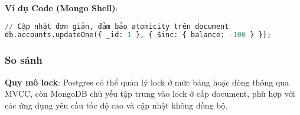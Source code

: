 \textbf{Ví dụ Code (Mongo Shell)}:
\begin{lstlisting}[language=sql]
// Cập nhật đơn giản, đảm bảo atomicity trên document
db.accounts.updateOne({ _id: 1 }, { $inc: { balance: -100 } });
\end{lstlisting}

\subsubsection{So sánh}

\textbf{Quy mô lock}: Postgres có thể quản lý lock ở mức bảng hoặc dòng thông qua MVCC, còn MongoDB chủ yếu tập trung vào lock ở cấp document, phù hợp với các ứng dụng yêu cầu tốc độ cao và cập nhật không đồng bộ.

